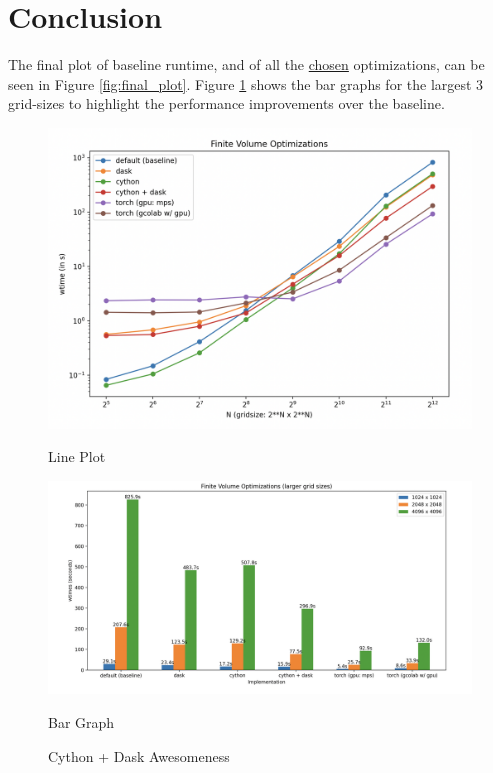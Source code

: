 \documentclass[a4paper,10pt]{article}
\begin{document}
\section{Conclusion}
The final plot of baseline runtime, and of all the \underline{chosen} optimizations, can be seen in Figure \ref{fig:final_plot}.
Figure \ref{fig:final_bar} shows the bar graphs for the largest 3 grid-sizes to highlight the performance improvements over the baseline.
\begin{figure}[h!]
   \begin{minipage}{0.5\textwidth}
       \centering
       \includegraphics[width=\linewidth]{images/final/final_plot.png}
      \caption{Line Plot}
       \label{fig:final_plot}
   \end{minipage}
   \hspace{0.1cm}
   \begin{minipage}{0.5\textwidth}
       \centering
       \includegraphics[width=\linewidth]{images/final/final_bar.png}
      \caption{Bar Graph}
      \label{fig:final_bar}
  \end{minipage}
  \caption{Cython + Dask Awesomeness}
\end{figure}
\end{document}
